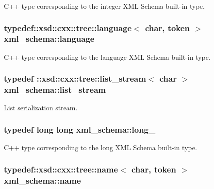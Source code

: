 C++ type corresponding to the integer X\-M\-L Schema built-\/in type. 

\hypertarget{namespacexml__schema_a9ccaf8d8efb41ea5331f512f381fc6ce}{
\subsubsection[{language}]{\setlength{\rightskip}{0pt plus 5cm}typedef\-::xsd\-::cxx\-::tree\-::language$<$ char, {\bf token} $>$ {\bf xml\-\_\-schema\-::language}}}\label{namespacexml__schema_a9ccaf8d8efb41ea5331f512f381fc6ce}


C++ type corresponding to the language X\-M\-L Schema built-\/in type. 

\hypertarget{namespacexml__schema_ab6c818ac91e70a25620375e0d000be83}{
\subsubsection[{list\-\_\-stream}]{\setlength{\rightskip}{0pt plus 5cm}typedef \-::xsd\-::cxx\-::tree\-::list\-\_\-stream$<$ char $>$ {\bf xml\-\_\-schema\-::list\-\_\-stream}}}\label{namespacexml__schema_ab6c818ac91e70a25620375e0d000be83}


List serialization stream. 

\hypertarget{namespacexml__schema_a1d78aacee49e26cb7a69d5aa97df1268}{
\subsubsection[{long\-\_\-}]{\setlength{\rightskip}{0pt plus 5cm}typedef long long {\bf xml\-\_\-schema\-::long\-\_\-}}}\label{namespacexml__schema_a1d78aacee49e26cb7a69d5aa97df1268}


C++ type corresponding to the long X\-M\-L Schema built-\/in type. 

\hypertarget{namespacexml__schema_a2f1617231643eded4c3b9aa5f1ed6c08}{
\subsubsection[{name}]{\setlength{\rightskip}{0pt plus 5cm}typedef\-::xsd\-::cxx\-::tree\-::name$<$ char, {\bf token} $>$ {\bf xml\-\_\-schema\-::name}}}\label{namespacexml__schema_a2f1617231643eded4c3b9aa5f1ed6c08}


